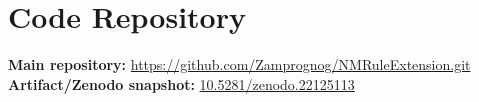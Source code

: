 \documentclass[runningheads]{llncs}
\newcommand{\suppurl}[2]{\noindent\textbf{#1:} \url{#2}\\}
\begin{document}


    
    
    

\section{Code Repository}
\suppurl{Main repository}{https://github.com/Zamprognog/NMRuleExtension.git}
\suppurl{Artifact/Zenodo snapshot}{10.5281/zenodo.22125113}
\end{document}
